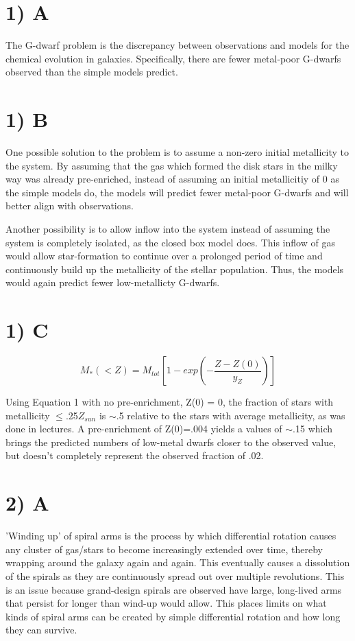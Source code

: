 \documentclass[12pt, 14paper]{report}
\begin{document}
\section*{1) A}
The G-dwarf problem is the discrepancy between observations and models for the chemical evolution in galaxies.  Specifically, there are fewer metal-poor G-dwarfs observed than the simple models predict.

\section*{1) B}
One possible solution to the problem is to assume a non-zero initial metallicity to the system.  By assuming that the gas which formed the disk stars in the milky way was already pre-enriched, instead of assuming an initial metallicitiy of 0 as the simple models do, the models will predict fewer metal-poor G-dwarfs and will better align with observations.

Another possibility is to allow inflow into the system instead of assuming the system is completely isolated, as the closed box model does.  This inflow of gas would allow star-formation to continue over a prolonged period of time and continuously build up the metallicity of the stellar population.  Thus, the models would again predict fewer low-metallicty G-dwarfs.

\section*{1) C}
\begin{equation}
M_{\ast}(<Z) = M_{tot}[ 1 - exp(-\frac{ Z - Z(0) }{ y_Z} ) ]
\end{equation}

Using Equation 1 with no pre-enrichment, Z(0) = 0, the fraction of stars with metallicity $\le$.25$Z_{sun}$ is $\sim$.5 relative to the stars with average metallicity, as was done in lectures.  A pre-enrichment of Z(0)=.004 yields a values of $\sim$.15 which brings the predicted numbers of low-metal dwarfs closer to the observed value, but doesn't completely represent the observed fraction of .02.

\section*{2) A}
'Winding up' of spiral arms is the process by which differential rotation causes any cluster of gas/stars to become increasingly extended over time, thereby wrapping around the galaxy again and again.  This eventually causes a dissolution of the spirals as they are continuously spread out over multiple revolutions.  This is an issue because grand-design spirals are observed have large, long-lived arms that persist for longer than wind-up would allow.  This places limits on what kinds of spiral arms can be created by simple differential rotation and how long they can survive.
\end{document}
